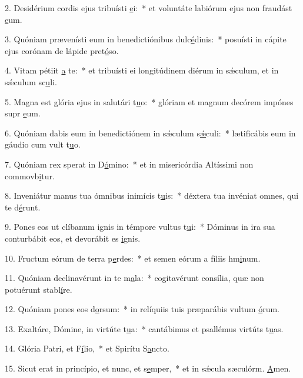 2. Desidérium cordis ejus tribuísti \uline{e}i:~* et voluntáte labiórum ejus non fraudást \uline{e}um.\par 
3. Quóniam prævenísti eum in benedictiónibus dulc\uline{é}dinis:~* posuísti in cápite ejus corónam de lápide pret\uline{ó}so.\par 
4. Vitam pétiit \uline{a} te:~* et tribuísti ei longitúdinem diérum in sǽculum, et in sǽculum sc\uline{u}li.\par 
5. Magna est glória ejus in salutári t\uline{u}o:~* glóriam et magnum decórem impónes supr \uline{e}um.\par 
6. Quóniam dabis eum in benedictiónem in sǽculum s\uline{ǽ}culi:~* lætificábis eum in gáudio cum vult t\uline{u}o.\par 
7. Quóniam rex sperat in D\uline{ó}mino:~* et in misericórdia Altíssimi non commovb\uline{i}tur.\par 
8. Inveniátur manus tua ómnibus inimícis t\uline{u}is:~* déxtera tua invéniat omnes, qui te d\uline{é}runt.\par 
9. Pones eos ut clíbanum ignis in témpore vultus t\uline{u}i:~* Dóminus in ira sua conturbábit eos, et devorábit es \uline{i}gnis.\par 
10. Fructum eórum de terra p\uline{e}rdes:~* et semen eórum a fíliis hm\uline{i}num.\par 
11. Quóniam declinavérunt in te m\uline{a}la:~* cogitavérunt consília, quæ non potuérunt stabl\uline{í}re.\par 
12. Quóniam pones eos d\uline{o}rsum:~* in relíquiis tuis præparábis vultum \uline{ó}rum.\par 
13. Exaltáre, Dómine, in virtúte t\uline{u}a:~* cantábimus et psallémus virtúts t\uline{u}as.\par 
14. Glória Patri, et F\uline{í}lio,~* et Spirítu S\uline{a}ncto.\par 
15. Sicut erat in princípio, et nunc, et s\uline{e}mper,~* et in sǽcula sæculórm. \uline{A}men.\par 
